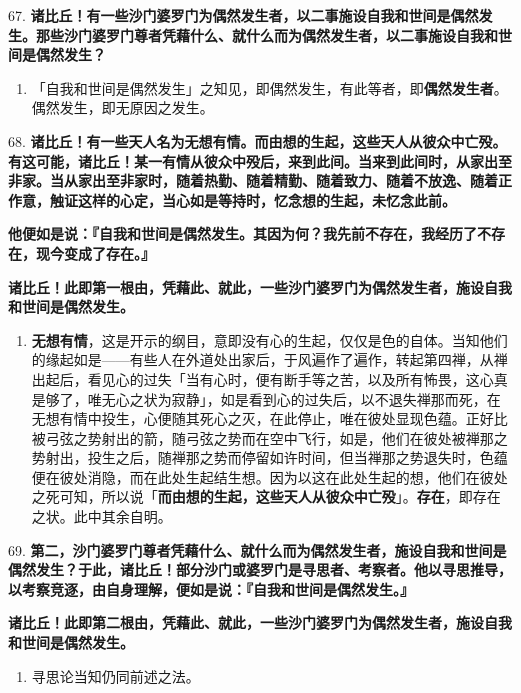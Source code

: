 {\Large 67.} \textbf{诸比丘！有一些沙门婆罗门为偶然发生者，以二事施设自我和世间是偶然发生。那些沙门婆罗门尊者凭藉什么、就什么而为偶然发生者，以二事施设自我和世间是偶然发生？}

\begin{enumerate}\item 「自我和世间是偶然发生」之知见，即偶然发生，有此等者，即\textbf{偶然发生者}。偶然发生，即无原因之发生。\end{enumerate}

{\Large 68.} \textbf{诸比丘！有一些天人名为无想有情。而由想的生起，这些天人从彼众中亡殁。有这可能，诸比丘！某一有情从彼众中殁后，来到此间。当来到此间时，从家出至非家。当从家出至非家时，随着热勤、随着精勤、随着致力、随着不放逸、随着正作意，触证这样的心定，当心如是等持时，忆念想的生起，未忆念此前。}

\textbf{他便如是说：『自我和世间是偶然发生。其因为何？我先前不存在，我经历了不存在，现今变成了存在。』}

\textbf{诸比丘！此即第一根由，凭藉此、就此，一些沙门婆罗门为偶然发生者，施设自我和世间是偶然发生。}

\begin{enumerate}\item \textbf{无想有情}，这是开示的纲目，意即没有心的生起，仅仅是色的自体。当知他们的缘起如是——有些人在外道处出家后，于风遍作了遍作，转起第四禅，从禅出起后，看见心的过失「当有心时，便有断手等之苦，以及所有怖畏，这心真是够了，唯无心之状为寂静」，如是看到心的过失后，以不退失禅那而死，在无想有情中投生，心便随其死心之灭，在此停止，唯在彼处显现色蕴。正好比被弓弦之势射出的箭，随弓弦之势而在空中飞行，如是，他们在彼处被禅那之势射出，投生之后，随禅那之势而停留如许时间，但当禅那之势退失时，色蕴便在彼处消隐，而在此处生起结生想。因为以这在此处生起的想，他们在彼处之死可知，所以说「\textbf{而由想的生起，这些天人从彼众中亡殁}」。\textbf{存在}，即存在之状。此中其余自明。\end{enumerate}

{\Large 69.} \textbf{第二，沙门婆罗门尊者凭藉什么、就什么而为偶然发生者，施设自我和世间是偶然发生？于此，诸比丘！部分沙门或婆罗门是寻思者、考察者。他以寻思推导，以考察竞逐，由自身理解，便如是说：『自我和世间是偶然发生。』}

\textbf{诸比丘！此即第二根由，凭藉此、就此，一些沙门婆罗门为偶然发生者，施设自我和世间是偶然发生。}

\begin{enumerate}\item 寻思论当知仍同前述之法。\end{enumerate}

